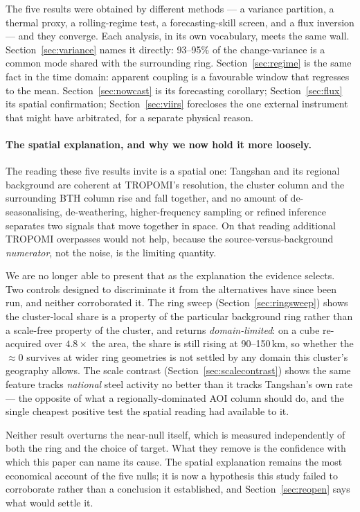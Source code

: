 \documentclass[11pt,a4paper]{article}
\begin{document}
The five results were obtained by different methods --- a variance partition, a thermal proxy, a
rolling-regime test, a forecasting-skill screen, and a flux inversion --- and they converge. Each
analysis, in its own vocabulary, meets the same wall. Section~\ref{sec:variance} names it
directly: 93--95\% of the change-variance is a common mode shared with the surrounding ring.
Section~\ref{sec:regime} is the same fact in the time domain: apparent coupling is a favourable
window that regresses to the mean. Section~\ref{sec:nowcast} is its forecasting corollary;
Section~\ref{sec:flux} its spatial confirmation; Section~\ref{sec:viirs} forecloses the one
external instrument that might have arbitrated, for a separate physical reason.

\paragraph{The spatial explanation, and why we now hold it more loosely.} The reading these five
results invite is a spatial one: Tangshan and its regional background are coherent at TROPOMI's
resolution, the cluster column and the surrounding BTH column rise and fall together, and no amount
of de-seasonalising, de-weathering, higher-frequency sampling or refined inference separates two
signals that move together in space. On that reading additional TROPOMI overpasses would not help,
because the source-versus-background \emph{numerator}, not the noise, is the limiting quantity.

We are no longer able to present that as the explanation the evidence selects. Two controls
designed to discriminate it from the alternatives have since been run, and neither corroborated it.
The ring sweep (Section~\ref{sec:ringsweep}) shows the cluster-local share is a property of the
particular background ring rather than a scale-free property of the cluster, and returns
\emph{domain-limited}: on a cube re-acquired over $4.8\times$ the area, the share is still rising at
90--150\,km, so whether the $\approx0$ survives at wider ring geometries is not settled by any
domain this cluster's geography allows. The scale contrast
(Section~\ref{sec:scalecontrast}) shows the same feature tracks \emph{national} steel activity no
better than it tracks Tangshan's own rate --- the opposite of what a regionally-dominated AOI column
should do, and the single cheapest positive test the spatial reading had available to it.

Neither result overturns the near-null itself, which is measured independently of both the ring and
the choice of target. What they remove is the confidence with which this paper can name its cause.
The spatial explanation remains the most economical account of the five nulls; it is now a
hypothesis this study failed to corroborate rather than a conclusion it established, and
Section~\ref{sec:reopen} says what would settle it.
\end{document}

